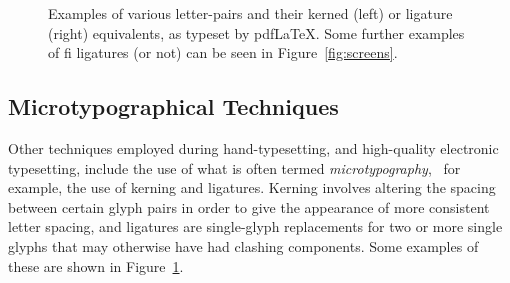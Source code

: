 \begin{figure}
 \caption[Examples of microtypographical techniques]{Examples of various letter-pairs and their kerned (left) or ligature (right) equivalents, as typeset by pdf\LaTeX{}. Some further examples of fi ligatures (or not) can be seen in Figure~\ref{fig:screens}.}
 \label{fig:kern-lig}
\end{figure}


\subsection{Microtypographical Techniques}
Other techniques employed during hand-type\-set\-t\-ing, and high-qua\-l\-ity electronic typesetting, include the use of what is often termed \emph{micro\-typo\-graphy},~\cite{Hurst2009} for example, the use of kerning and ligatures. Kerning involves altering the spacing between certain glyph pairs in order to give the appearance of more consistent letter spacing, and ligatures are sin\-gle-glyph replacements for two or more single glyphs that may otherwise have had clashing components. Some examples of these are shown in Figure~\ref{fig:kern-lig}.

